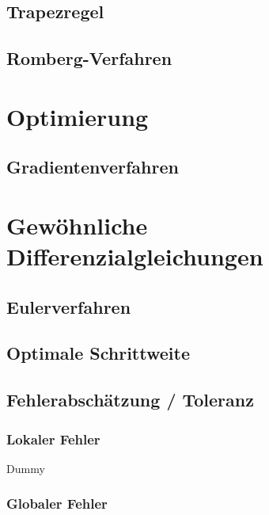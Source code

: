 \documentclass[a4paper, twoside]{article}
\begin{document}
\subsection{Trapezregel}


\subsection{Romberg-Verfahren}

\section{Optimierung}

\subsection{Gradientenverfahren}

\section{Gewöhnliche Differenzialgleichungen}

\subsection{Eulerverfahren}

\subsection{Optimale Schrittweite}

\subsection{Fehlerabschätzung / Toleranz}

\subsubsection{Lokaler Fehler}

Dummy

\subsubsection{Globaler Fehler}
\end{document}
